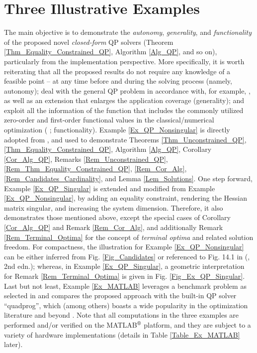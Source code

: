 \documentclass{imaman}
\numberwithin{equation}{section}
\begin{document}
\section{Three Illustrative Examples}
\label{Sec_Ex}
The main objective is to demonstrate the \textit{autonomy}, \textit{generality}, and \textit{functionality} of the proposed novel \textit{closed-form} QP solvers (Theorem \ref{Thm_Equality_Constrained_QP}, Algorithm \ref{Alg_QP}, and so on), particularly from the implementation perspective. More specifically, it is worth reiterating that all the proposed results do not require any knowledge of a feasible point -- at any time before and during the solving process (namely, autonomy); deal with the general QP problem in accordance with, for example, \cite{Lu(Ye):03(16)}, as well as an extension that enlarges the application coverage (generality); and exploit all the information of the function that includes the commonly utilized zero-order \cite{DuJoWaWi:15} and first-order functional values in the classical/numerical optimization ( \cite{NoWr:06}; functionality). Example \ref{Ex_QP_Nonsingular} is directly adopted from \cite{Lu(Ye):03(16)}, and used to demonstrate Theorems \ref{Thm_Unconstrained_QP}, \ref{Thm_Equality_Constrained_QP}, Algorithm \ref{Alg_QP}, Corollary \ref{Cor_Alg_QP}, Remarks \ref{Rem_Unconstrained_QP}, \ref{Rem_Thm_Equality_Constrained_QP}, \ref{Rem_Cor_Alg}, \ref{Rem_Candidates_Cardinality}, and Lemma \ref{Lem_Solutions}. One step forward, Example \ref{Ex_QP_Singular} is extended and modified from Example \ref{Ex_QP_Nonsingular}, by adding an equality constraint, rendering the Hessian matrix singular, and increasing the system dimension. Therefore, it also demonstrates those mentioned above, except the special cases of Corollary \ref{Cor_Alg_QP} and Remark \ref{Rem_Cor_Alg}, and additionally Remark \ref{Rem_Terminal_Optima} for the concept of \textit{terminal optima} and related solution freedom. For compactness, the illustration for Example \ref{Ex_QP_Nonsingular} can be either inferred from Fig. \ref{Fig_Candidates} or referenced to Fig. 14.1 in (\cite{Lu(Ye):03(16)}, 2nd edn.); whereas, in Example \ref{Ex_QP_Singular}, a geometric interpretation for Remark \ref{Rem_Terminal_Optima} is given in Fig. \ref{Fig_Ex_QP_Singular}. Last but not least, Example \ref{Ex_MATLAB} leverages a benchmark problem as selected in \cite{MATLAB} and compares the proposed approach with the built-in QP solver ``quadprog'', which (among others) boasts a wide popularity in the optimization literature and beyond \cite{TsMa:21}. Note that all computations in the three examples are performed and/or verified on the MATLAB$\textsuperscript{\textregistered}$ platform, and they are subject to a variety of hardware implementations (details in Table \ref{Table_Ex_MATLAB} later).
\end{document}
